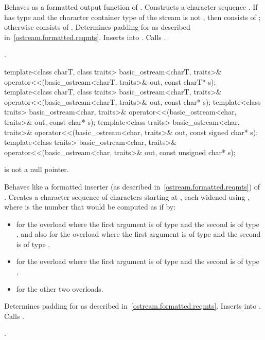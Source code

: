 \begin{itemdescr}
\pnum
\effects
Behaves as a formatted output function
of . Constructs a character sequence .
If  has type
and the character container type of the stream is not
,
then  consists of
;
otherwise  consists of
. Determines padding for  as described
in~\ref{ostream.formatted.reqmts}. Inserts  into
. Calls .

\pnum
\returns
{}.
\end{itemdescr}

%
\begin{itemdecl}
template<class charT, class traits>
  basic_ostream<charT, traits>& operator<<(basic_ostream<charT, traits>& out, const charT* s);
template<class charT, class traits>
  basic_ostream<charT, traits>& operator<<(basic_ostream<charT, traits>& out, const char* s);
template<class traits>
  basic_ostream<char, traits>& operator<<(basic_ostream<char, traits>& out, const char* s);
template<class traits>
  basic_ostream<char, traits>& operator<<(basic_ostream<char, traits>& out, const signed char* s);
template<class traits>
  basic_ostream<char, traits>& operator<<(basic_ostream<char, traits>& out,
                                          const unsigned char* s);
\end{itemdecl}

\begin{itemdescr}
\pnum
\expects
{} is not a null pointer.

\pnum
\effects
Behaves like a formatted inserter (as described in~\ref{ostream.formatted.reqmts}) of .
Creates a character sequence  of  characters
starting at , each widened using
,
where  is the number that would be computed as if by:
\begin{itemize}
\item
{}
for the overload where the first argument is of type
and the second is of type
,
and also for the overload where the first argument is of type
and the second is of type
,
\item
{}
for the overload where the first argument is of type
and the second is of type
,
\item
{}
for the other two overloads.
\end{itemize}
Determines padding for  as described
in~\ref{ostream.formatted.reqmts}. Inserts  into
. Calls .

\pnum
\returns
{}.
\end{itemdescr}

